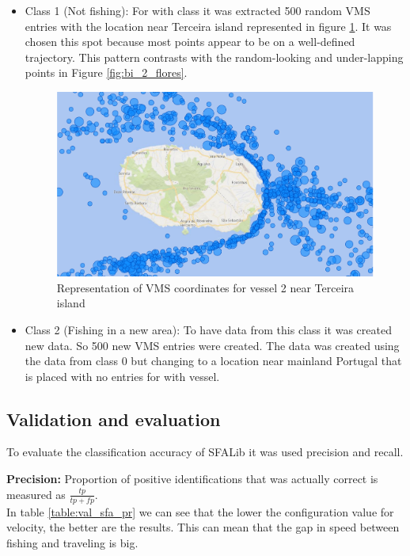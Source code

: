 \begin{itemize}
\item Class 1 (Not fishing): For with class it was extracted 500 random VMS entries with the location near Terceira island represented in figure \ref{fig:bi_2_travel}. It was chosen this spot because most points appear to be on a well-defined trajectory. This pattern contrasts with the random-looking and under-lapping points in Figure \ref{fig:bi_2_flores}. 

\begin{figure}[H]
    \centering
    \includegraphics[width=0.8\linewidth]{Chapters/img/2viagem.pdf}
    \caption{Representation of VMS coordinates for vessel 2 near Terceira island}
    \label{fig:bi_2_travel}
\end{figure}



\item Class 2 (Fishing in a new area): To have data from this class it was created new data. So 500 new VMS entries were created. The data was created using the data from class 0 but changing to a location near mainland Portugal that is placed with no entries for with vessel. 

\end{itemize}




\subsection{Validation and evaluation}
\label{sec:val_SFA_val_eva}

To evaluate the classification accuracy of SFALib it was used precision and recall.

\textbf{Precision:} Proportion of positive identifications that was actually correct is measured as \(\frac{tp}{tp+fp} \).\\
In table \ref{table:val_sfa_pr} we can see that the lower the configuration value for velocity, the better are the results.
This can mean that the gap in speed between fishing and traveling is big.

